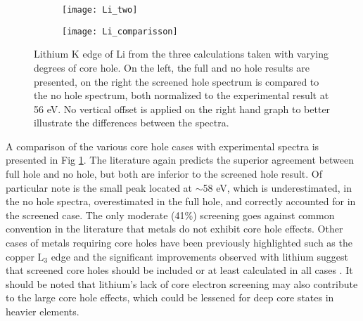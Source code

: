 \begin{figure}
	\centering
	\begin{subfigure}{0.45\textwidth}
		\texttt{[image: Li\_two]}
	\end{subfigure}
	\hspace{-0.01cm}
	\begin{subfigure}{0.45\textwidth}
		\texttt{[image: Li\_comparisson]}
	\end{subfigure}

	\caption{Lithium K edge of Li from the three calculations taken with varying degrees of core hole. On the left, the full and no hole results are presented, on the right the screened hole spectrum is compared to the no hole spectrum, both normalized to the experimental result at 56 eV. No vertical offset is applied on the right hand graph to better illustrate the differences between the spectra. }
	\label{Li_spectra}
\end{figure}


A comparison of the various core hole cases with experimental spectra is presented in Fig \ref{Li_spectra}. The literature again predicts the superior agreement between full hole and no hole, but both are inferior to the screened hole result.  Of particular note is the small peak located at $ \sim$58 eV, which is underestimated, in the no hole spectra, overestimated in the full hole, and correctly accounted for in the screened case.  The only moderate (41\%) screening goes against common convention in the literature that metals do not exhibit core hole effects.  Other cases of metals requiring core holes have been previously highlighted such as the copper L$_3$ edge and the significant improvements observed with lithium suggest that screened core holes should be included or at least calculated in all cases \cite{hebert_improvement_2003}.  It should be noted that lithium's lack of core electron screening may also contribute to the large core hole effects, which could be lessened for deep core states in heavier elements. 

